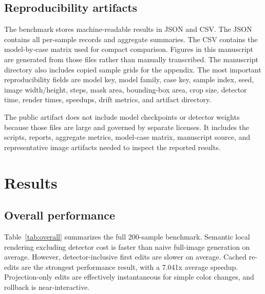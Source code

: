 \documentclass[final,5p,times,number,sort&compress]{elsarticle}
\begin{document}
\subsection{Reproducibility artifacts}

The benchmark stores machine-readable results in JSON and CSV. The JSON contains all per-sample records and aggregate summaries. The CSV contains the model-by-case matrix used for compact comparison. Figures in this manuscript are generated from those files rather than manually transcribed. The manuscript directory also includes copied sample grids for the appendix. The most important reproducibility fields are model key, model family, case key, sample index, seed, image width/height, steps, mask area, bounding-box area, crop size, detector time, render times, speedups, drift metrics, and artifact directory.

The public artifact does not include model checkpoints or detector weights because those files are large and governed by separate licenses. It includes the scripts, reports, aggregate metrics, model-case matrix, manuscript source, and representative image artifacts needed to inspect the reported results.

\section{Results}

\subsection{Overall performance}

Table~\ref{tab:overall} summarizes the full 200-sample benchmark. Semantic local rendering excluding detector cost is faster than naive full-image generation on average. However, detector-inclusive first edits are slower on average. Cached re-edits are the strongest performance result, with a 7.041x average speedup. Projection-only edits are effectively instantaneous for simple color changes, and rollback is near-interactive.
\end{document}
